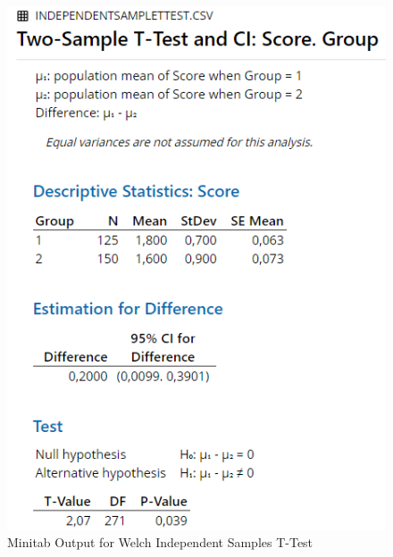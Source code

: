 \documentclass[
]{book}
\begin{document}
\begin{figure}[!h]
\includegraphics{Screenshots/Independent Samples T test/isttMinitab} \caption{\label{fig:isttMinitab}Minitab Output for Welch Independent Samples T-Test}\label{fig:isttMinitab}
\end{figure}
\end{document}
